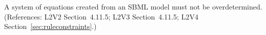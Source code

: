 A system of equations created from an SBML model must not be
overdetermined.  (References: L2V2 Section~4.11.5; L2V3
Section~4.11.5; L2V4 Section~\ref{sec:ruleconstraints}.)
